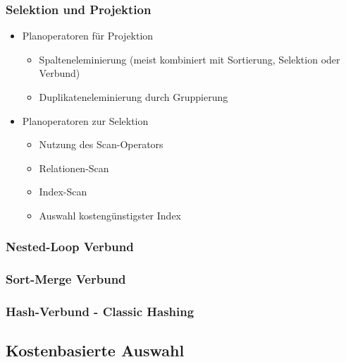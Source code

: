 \documentclass[a4paper]{article}
\begin{document}
    \subsubsection{Selektion und Projektion}
    \begin{itemize}
        \item Planoperatoren für Projektion
        \begin{itemize}
            \item Spalteneleminierung (meist kombiniert mit Sortierung, Selektion oder Verbund)
            \item Duplikateneleminierung durch Gruppierung
        \end{itemize}
        
        \item Planoperatoren zur Selektion
        \begin{itemize}
            \item Nutzung des Scan-Operators
            \item Relationen-Scan
            \item Index-Scan
            \item Auswahl kostengünstigster Index
        \end{itemize}
    \end{itemize}
    
    \subsubsection{Nested-Loop Verbund}
    \subsubsection{Sort-Merge Verbund}
    \subsubsection{Hash-Verbund - Classic Hashing}

\subsection{Kostenbasierte Auswahl}
\end{document}
